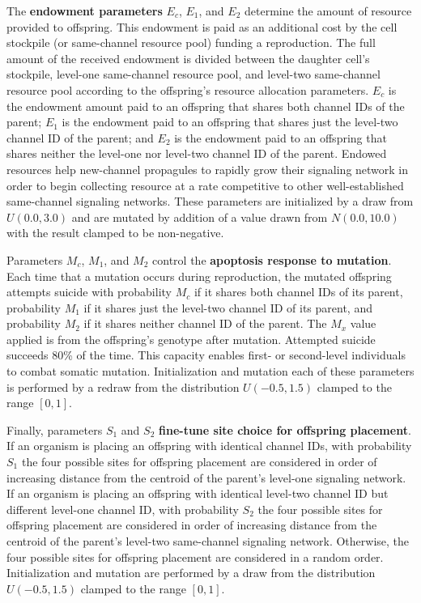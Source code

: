 The \textbf{endowment parameters} $E_{c}$, $E_1$, and $E_2$ determine the amount of resource provided to offspring.
This endowment is paid as an additional cost by the cell stockpile (or same-channel resource pool) funding a reproduction.
The full amount of the received endowment is divided between the daughter cell's stockpile, level-one same-channel resource pool, and level-two same-channel resource pool according to the offspring's resource allocation parameters. %
$E_{c}$ is the endowment amount paid to an offspring that shares both channel IDs of the parent;
$E_1$ is the endowment paid to an offspring that shares just the level-two channel ID of the parent;
and $E_2$ is the endowment paid to an offspring that shares neither the level-one nor level-two channel ID of the parent.
Endowed resources help new-channel propagules to rapidly grow their signaling network in order to begin collecting resource at a rate competitive to other well-established same-channel signaling networks.
These parameters are initialized by a draw from $U(0.0, 3.0)$ and are mutated by addition of a value drawn from $N(0.0,10.0)$ with the result clamped to be non-negative.


Parameters $M_{c}$, $M_1$, and $M_2$ control the \textbf{apoptosis response to mutation}.
Each time that a mutation occurs during reproduction, the mutated offspring attempts suicide with probability $M_{c}$ if it shares both channel IDs of its parent, probability $M_1$ if it shares just the level-two channel ID of its parent, and probability $M_2$ if it shares neither channel ID of the parent.
The $M_x$ value applied is from the offspring's genotype after mutation.
Attempted suicide succeeds 80\% of the time.
This capacity enables first- or second-level individuals to combat somatic mutation.
Initialization and mutation each of these parameters is performed by a redraw from the distribution $U(-0.5,1.5)$ clamped to the range $[0,1]$.


Finally, parameters $S_1$ and $S_2$ \textbf{fine-tune site choice for offspring placement}.
If an organism is placing an offspring with identical channel IDs, with probability $S_1$ the four possible sites for offspring placement are considered in order of increasing distance from the centroid of the parent's level-one signaling network.
If an organism is placing an offspring with identical level-two channel ID but different level-one channel ID, with probability $S_2$ the four possible sites for offspring placement are considered in order of increasing distance from the centroid of the parent's level-two same-channel signaling network.
Otherwise, the four possible sites for offspring placement are considered in a random order.
Initialization and mutation are performed by a draw from the distribution $U(-0.5,1.5)$ clamped to the range $[0,1]$.

